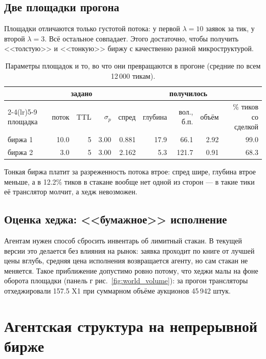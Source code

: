 \documentclass[11pt,a4paper]{article}
\begin{document}
\subsection{Две площадки прогона}

Площадки отличаются только густотой потока: у первой
\(\lambda = 10\) заявок за тик, у второй \(\lambda = 3\).
Всё остальное совпадает. Этого достаточно, чтобы получить <<толстую>> и
<<тонкую>> биржу с качественно разной микроструктурой.

\begin{table}[H]
\centering
\caption{Параметры площадок и то, во что они превращаются в прогоне
(средние по всем 12\,000 тикам).}
\small
\begin{tabular}{lrrrrrrrr}
\toprule
& \multicolumn{3}{c}{задано} & \multicolumn{5}{c}{получилось} \\
\cmidrule(lr){2-4}\cmidrule(lr){5-9}
площадка & поток & TTL & \(\sigma_p\) & спред & глубина & вол., б.п.
& объём & \% тиков со сделкой \\
\midrule
биржа 1 & 10.0 & 5 & 3.00 & 0.881 & 17.9 & 66.1 & 2.92 & 99.0 \\
биржа 2 & 3.0 & 5 & 3.00 & 2.162 & 5.3 & 121.7 & 0.91 & 68.3 \\
\bottomrule
\end{tabular}
\end{table}

Тонкая биржа платит за разреженность потока втрое: спред шире, глубина
втрое меньше, а в 12.2\% тиков в стакане вообще нет одной из сторон ---
в такие тики её транслятор молчит, а хедж невозможен.

\subsection{Оценка хеджа: <<бумажное>> исполнение}

Агентам нужен способ сбросить инвентарь об лимитный стакан. В текущей
версии это делается без влияния на рынок: заявка проходит по книге от
лучшей цены вглубь, средняя цена исполнения возвращается агенту, но сам
стакан не меняется. Такое приближение допустимо ровно потому, что
хеджи малы на фоне оборота площадки (панель г рис.~\ref{fig:world_volume}):
за прогон трансляторы отхеджировали 157.5 X1 при суммарном
объёме аукционов 45\,942 штук.


\clearpage
\section{Агентская структура на непрерывной бирже}
\end{document}
